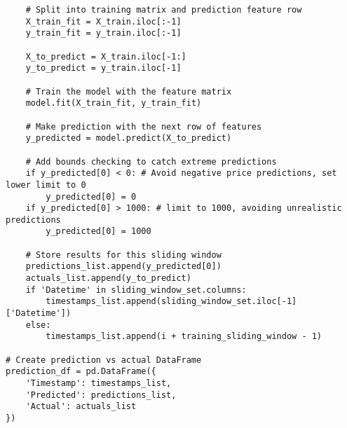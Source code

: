 \documentclass[12pt]{report} %
\begin{document}
\begin{lstlisting}
    # Split into training matrix and prediction feature row
    X_train_fit = X_train.iloc[:-1]
    y_train_fit = y_train.iloc[:-1]

    X_to_predict = X_train.iloc[-1:]
    y_to_predict = y_train.iloc[-1]

    # Train the model with the feature matrix
    model.fit(X_train_fit, y_train_fit)

    # Make prediction with the next row of features
    y_predicted = model.predict(X_to_predict)

    # Add bounds checking to catch extreme predictions
    if y_predicted[0] < 0: # Avoid negative price predictions, set lower limit to 0
        y_predicted[0] = 0
    if y_predicted[0] > 1000: # limit to 1000, avoiding unrealistic predictions
        y_predicted[0] = 1000

    # Store results for this sliding window
    predictions_list.append(y_predicted[0])
    actuals_list.append(y_to_predict)
    if 'Datetime' in sliding_window_set.columns:
        timestamps_list.append(sliding_window_set.iloc[-1]['Datetime'])
    else:
        timestamps_list.append(i + training_sliding_window - 1)

# Create prediction vs actual DataFrame
prediction_df = pd.DataFrame({
    'Timestamp': timestamps_list,
    'Predicted': predictions_list,
    'Actual': actuals_list
})
\end{lstlisting}




\end{document}
